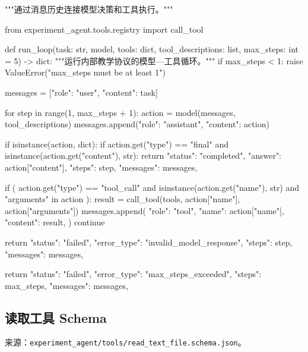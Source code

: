 \begin{Code}
"""通过消息历史连接模型决策和工具执行。"""

from experiment_agent.tools.registry import call_tool


def run_loop(task: str, model, tools: dict, tool_descriptions: list, max_steps: int = 5) -> dict:
    """运行内部教学协议的模型—工具循环。"""
    if max_steps < 1:
        raise ValueError("max_steps must be at least 1")

    messages = [{"role": "user", "content": task}]

    for step in range(1, max_steps + 1):
        action = model(messages, tool_descriptions)
        messages.append({"role": "assistant", "content": action})

        if isinstance(action, dict):
            if action.get("type") == "final" and isinstance(action.get("content"), str):
                return {
                    "status": "completed",
                    "answer": action["content"],
                    "steps": step,
                    "messages": messages,
                }

            if (
                action.get("type") == "tool_call"
                and isinstance(action.get("name"), str)
                and "arguments" in action
            ):
                result = call_tool(tools, action["name"], action["arguments"])
                messages.append({
                    "role": "tool",
                    "name": action["name"],
                    "content": result,
                })
                continue

        return {
            "status": "failed",
            "error_type": "invalid_model_response",
            "steps": step,
            "messages": messages,
        }

    return {
        "status": "failed",
        "error_type": "max_steps_exceeded",
        "steps": max_steps,
        "messages": messages,
    }
\end{Code}

\subsection{读取工具 Schema}

来源：\nolinkurl{experiment_agent/tools/read_text_file.schema.json}。


